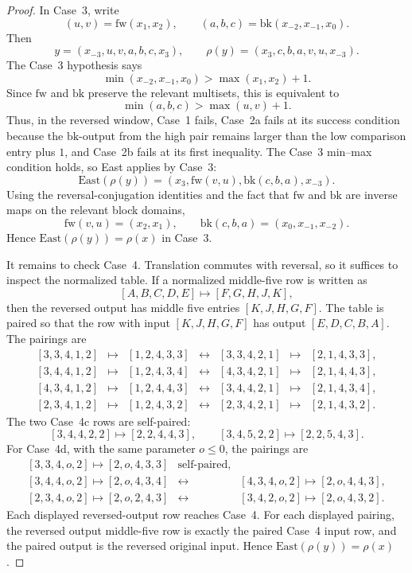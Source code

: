 \documentclass[11pt]{article}
\theoremstyle{plain}
\theoremstyle{definition}
\theoremstyle{remark}
\begin{document}
\begin{proof}
In Case~3, write
\[
  (u,v)=\mathrm{fw}(x_1,x_2),
  \qquad
  (a,b,c)=\mathrm{bk}(x_{-2},x_{-1},x_0).
\]
Then
\[
  y=(x_{-3},u,v,a,b,c,x_3),
  \qquad
  \rho(y)=(x_3,c,b,a,v,u,x_{-3}).
\]
The Case~3 hypothesis says
\[
  \min(x_{-2},x_{-1},x_0)>\max(x_1,x_2)+1.
\]
Since \(\mathrm{fw}\) and \(\mathrm{bk}\) preserve the relevant multisets, this
is equivalent to
\[
  \min(a,b,c)>\max(u,v)+1.
\]
Thus, in the reversed window, Case~1 fails, Case~2a fails at its success
condition because the \(\mathrm{bk}\)-output from the high pair remains larger
than the low comparison entry plus \(1\), and Case~2b fails at its first
inequality. The Case~3 min--max condition holds, so East applies by Case~3:
\[
  \mathrm{East}(\rho(y))
  =(x_3,\mathrm{fw}(v,u),\mathrm{bk}(c,b,a),x_{-3}).
\]
Using the reversal-conjugation identities and the fact that \(\mathrm{fw}\) and
\(\mathrm{bk}\) are inverse maps on the relevant block domains,
\[
  \mathrm{fw}(v,u)=(x_2,x_1),
  \qquad
  \mathrm{bk}(c,b,a)=(x_0,x_{-1},x_{-2}).
\]
Hence \(\mathrm{East}(\rho(y))=\rho(x)\) in Case~3.

It remains to check Case~4. Translation commutes with reversal, so it suffices
to inspect the normalized table. If a normalized middle-five row is written as
\[
  [A,B,C,D,E]\longmapsto [F,G,H,J,K],
\]
then the reversed output has middle five entries \([K,J,H,G,F]\). The table is
paired so that the row with input \([K,J,H,G,F]\) has output
\([E,D,C,B,A]\). The pairings are
\[
\begin{array}{rclcrcl}
[3,3,4,1,2]&\mapsto&[1,2,4,3,3]
&\leftrightarrow&
[3,3,4,2,1]&\mapsto&[2,1,4,3,3],\\[2pt]
[3,4,4,1,2]&\mapsto&[1,2,4,3,4]
&\leftrightarrow&
[4,3,4,2,1]&\mapsto&[2,1,4,4,3],\\[2pt]
[4,3,4,1,2]&\mapsto&[1,2,4,4,3]
&\leftrightarrow&
[3,4,4,2,1]&\mapsto&[2,1,4,3,4],\\[2pt]
[2,3,4,1,2]&\mapsto&[1,2,4,3,2]
&\leftrightarrow&
[2,3,4,2,1]&\mapsto&[2,1,4,3,2].
\end{array}
\]
The two Case~4c rows are self-paired:
\[
  [3,4,4,2,2]\mapsto[2,2,4,4,3],
  \qquad
  [3,4,5,2,2]\mapsto[2,2,5,4,3].
\]
For Case~4d, with the same parameter \(o\le 0\), the pairings are
\[
\begin{array}{rcl}
[3,3,4,o,2]\mapsto[2,o,4,3,3] & \text{self-paired},\\[2pt]
[3,4,4,o,2]\mapsto[2,o,4,3,4]
&\leftrightarrow&
[4,3,4,o,2]\mapsto[2,o,4,4,3],\\[2pt]
[2,3,4,o,2]\mapsto[2,o,2,4,3]
&\leftrightarrow&
[3,4,2,o,2]\mapsto[2,o,4,3,2].
\end{array}
\]
Each displayed reversed-output row reaches Case~4.  For each displayed
pairing, the reversed output middle-five row is exactly the paired Case~4 input
row, and the paired output is the reversed original input.  Hence
\(\mathrm{East}(\rho(y))=\rho(x)\).


\end{proof}
\end{document}
